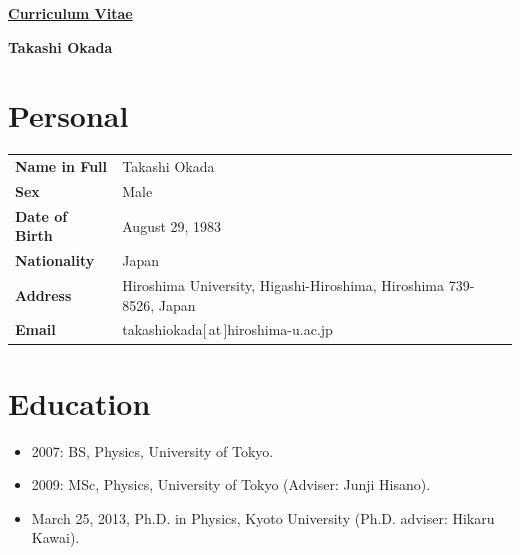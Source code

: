 \documentclass[letterpaper,12pt]{article}
\def\name{{Takashi Okada}}
\begin{document}

\begin{center}
\underline{{\huge{ {\bf Curriculum Vitae}} }}
\end{center}

\begin{center}
{\huge {\bf Takashi Okada}}
\end{center}

\vspace{0.25in}




\section*{{\bf Personal}}
\begin{tabular}{@{}l p{11.5cm}@{}}
{\bf Name in Full} & Takashi Okada\\
{\bf Sex}           & Male\\
{\bf Date of Birth} & August 29, 1983\\
{\bf Nationality}   & Japan\\
{\bf Address}       & Hiroshima University, Higashi-Hiroshima, Hiroshima 739-8526, Japan\\
{\bf Email}         & takashiokada[\,at\,]hiroshima-u.ac.jp\\
\end{tabular}


\section*{{\bf Education}}

\begin{itemize}
 \item 2007:  BS, Physics, University of Tokyo.
  \item 2009: MSc, Physics, University of Tokyo (Adviser: Junji Hisano).
  \item March 25, 2013, Ph.D. in Physics, Kyoto University (Ph.D. adviser: Hikaru Kawai).


\end{itemize}
\end{document}
